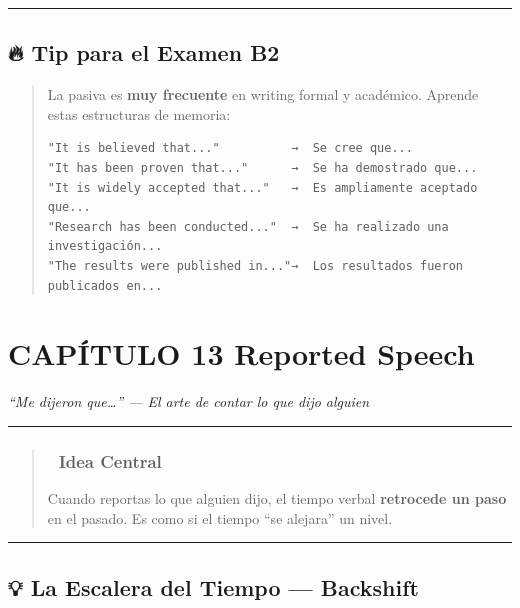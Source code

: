 \documentclass[
  spanish,
  letterpaper,
]{scrbook}
\begin{document}
\begin{center}\rule{0.5\linewidth}{0.5pt}\end{center}

\section{🔥 Tip para el Examen B2}\label{tip-para-el-examen-b2-1}

\begin{quote}
La pasiva es \textbf{muy frecuente} en writing formal y académico.
Aprende estas estructuras de memoria:

\begin{verbatim}
"It is believed that..."          →  Se cree que...
"It has been proven that..."      →  Se ha demostrado que...
"It is widely accepted that..."   →  Es ampliamente aceptado que...
"Research has been conducted..."  →  Se ha realizado una investigación...
"The results were published in..."→  Los resultados fueron publicados en...
\end{verbatim}
\end{quote}

\chapter{CAPÍTULO 13 Reported
Speech}\label{capuxedtulo-13-reported-speech}

\emph{``Me dijeron que\ldots{}'' --- El arte de contar lo que dijo
alguien}

\begin{center}\rule{0.5\linewidth}{0.5pt}\end{center}

\begin{quote}
\subsection{🎯 Idea Central}\label{idea-central-11}

Cuando reportas lo que alguien dijo, el tiempo verbal \textbf{retrocede
un paso} en el pasado. Es como si el tiempo ``se alejara'' un nivel.
\end{quote}

\begin{center}\rule{0.5\linewidth}{0.5pt}\end{center}

\section{💡 La Escalera del Tiempo ---
Backshift}\label{la-escalera-del-tiempo-backshift}
\end{document}
